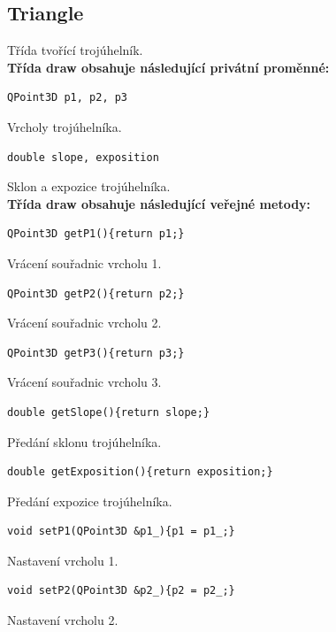 \documentclass[a4paper, 12pt, oneside, titlepage]{article} %
\begin{document}
\subsection{Triangle}
Třída tvořící trojúhelník.\\
\textbf{Třída draw obsahuje následující privátní proměnné:}
\begin{verbatim}
QPoint3D p1, p2, p3
\end{verbatim}
Vrcholy trojúhelníka.\\

\begin{verbatim}
double slope, exposition
\end{verbatim}
Sklon a expozice trojúhelníka.\\

\textbf{Třída draw obsahuje následující veřejné metody:}
\begin{verbatim}
QPoint3D getP1(){return p1;}
\end{verbatim}
Vrácení souřadnic vrcholu 1.\\

\begin{verbatim}
QPoint3D getP2(){return p2;}
\end{verbatim}
Vrácení souřadnic vrcholu 2.\\

\begin{verbatim}
QPoint3D getP3(){return p3;}
\end{verbatim}
Vrácení souřadnic vrcholu 3.\\

\begin{verbatim}
double getSlope(){return slope;}
\end{verbatim}
Předání sklonu trojúhelníka.\\

\begin{verbatim}
double getExposition(){return exposition;}
\end{verbatim}
Předání expozice trojúhelníka.\\

\begin{verbatim}
void setP1(QPoint3D &p1_){p1 = p1_;}
\end{verbatim}
Nastavení vrcholu 1.\\

\begin{verbatim}
void setP2(QPoint3D &p2_){p2 = p2_;}
\end{verbatim}
Nastavení vrcholu 2.\\
\end{document}
